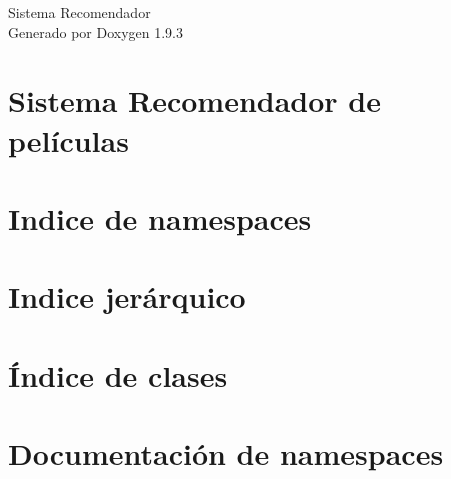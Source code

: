\documentclass[twoside]{book}
\newcommand{\+}{\discretionary{\mbox{\scriptsize$\hookleftarrow$}}{}{}}
\newcommand{\clearemptydoublepage}{%
    \newpage{\pagestyle{empty}\cleardoublepage}%
  }
\begin{document}
  \raggedbottom
    \hypersetup{pageanchor=false,
                bookmarksnumbered=true,
                pdfencoding=unicode
               }
  \begin{titlepage}
  \vspace*{7cm}
  \begin{center}%
  {\Large Sistema Recomendador}\\
  \vspace*{1cm}
  {\large Generado por Doxygen 1.9.3}\\
  \end{center}
  \end{titlepage}
  \clearemptydoublepage
  \tableofcontents
  \clearemptydoublepage
  \hypersetup{pageanchor=true}
\chapter{Sistema Recomendador de películas}
\label{md__r_e_a_d_m_e}

\chapter{Indice de namespaces}

\chapter{Indice jerárquico}

\chapter{Índice de clases}

\chapter{Documentación de namespaces}

\end{document}
